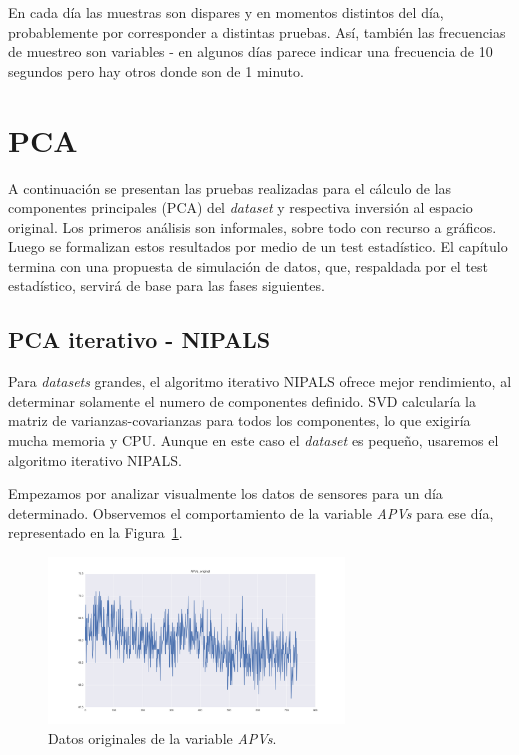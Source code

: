 \documentclass[11pt,spanish,listoffigures,listoftables]{tfgetsinf}
\begin{document}
        En cada día las muestras son dispares y en momentos distintos del día, probablemente por corresponder a distintas pruebas. Así, también las frecuencias de muestreo son variables - en algunos días parece indicar una frecuencia de 10 segundos pero hay otros donde son de 1 minuto.
    
    \section{PCA}
    A continuación se presentan las pruebas realizadas para el cálculo de las componentes principales (PCA) del {\em dataset} y respectiva inversión al espacio original. Los primeros análisis son informales, sobre todo con recurso a gráficos. Luego se formalizan estos resultados por medio de un test estadístico. El capítulo termina con una propuesta de simulación de datos, que, respaldada por el test estadístico, servirá de base para las fases siguientes.
    
    \subsection{PCA iterativo - NIPALS}
    Para {\em datasets} grandes, el algoritmo iterativo NIPALS ofrece mejor rendimiento, al determinar solamente el numero de componentes definido. SVD calcularía la matriz de varianzas-covarianzas para todos los componentes, lo que exigiría mucha memoria y CPU. Aunque en este caso el {\em dataset} es pequeño, usaremos el algoritmo iterativo NIPALS.
    
    Empezamos por analizar visualmente los datos de sensores para un día determinado. Observemos el comportamiento de la variable {\em APVs} para ese día, representado en la Figura~\ref{fig:APVs_original}. 
    
    \begin{figure}[h]
        \centering
        \includegraphics[width=0.7\textwidth]{APVs_original.png}
        \caption{Datos originales de la variable {\em APVs}.}
        \label{fig:APVs_original}
    \end{figure}
    
\end{document}

